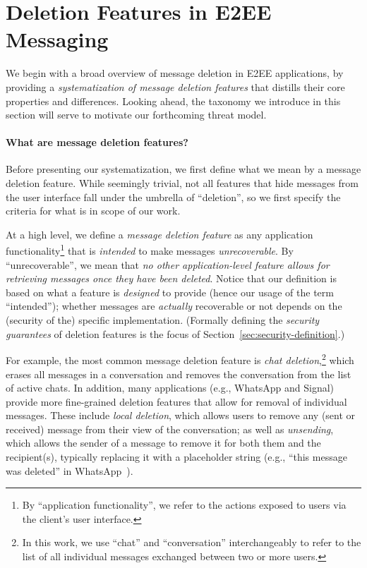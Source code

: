 \section{Deletion Features in E2EE Messaging}\label{sec:e2ee-deletion-systematization}
We begin with a broad overview of message deletion in E2EE applications, by providing a \emph{systematization of message deletion features} that distills their core properties and differences. Looking ahead, the taxonomy we introduce in this section will serve to motivate our forthcoming threat model.

\paragraph{What are message deletion features?} Before presenting our systematization, we first define what we mean by a message deletion feature. While seemingly trivial, not all features that hide messages from the user interface fall under the umbrella of ``deletion'', so we first specify the criteria for what is in scope of our work.

At a high level, we define a \emph{message deletion feature} as any application functionality\footnote{By ``application functionality'', we refer to the actions exposed to users via the client's user interface.} that is \emph{intended} to make messages \emph{unrecoverable}. By ``unrecoverable'', we mean that \emph{no other application-level feature allows for retrieving messages once they have been deleted}. Notice that our definition is based on what a feature is \emph{designed} to provide (hence our usage of the term ``intended''); whether messages are \emph{actually} recoverable or not depends on the (security of the) specific implementation. (Formally defining the \emph{security guarantees} of deletion features is the focus of Section~\ref{sec:security-definition}.)

For example, the most common message deletion feature is \emph{chat deletion},\footnote{In this work, we use ``chat'' and ``conversation'' interchangeably to refer to the list of all individual messages exchanged between two or more users.} which erases all messages in a conversation and removes the conversation from the list of active chats. In addition, many applications (e.g., WhatsApp and Signal) provide more fine-grained deletion features that allow for removal of individual messages. These include \emph{local deletion}, which allows users to remove any (sent or received) message from their view of the conversation; as well as \emph{unsending}, which allows the sender of a message to remove it for both them and the recipient(s), typically replacing it with a placeholder string (e.g., ``this message was deleted'' in WhatsApp~\cite{whatsapp-delete-message}). 

